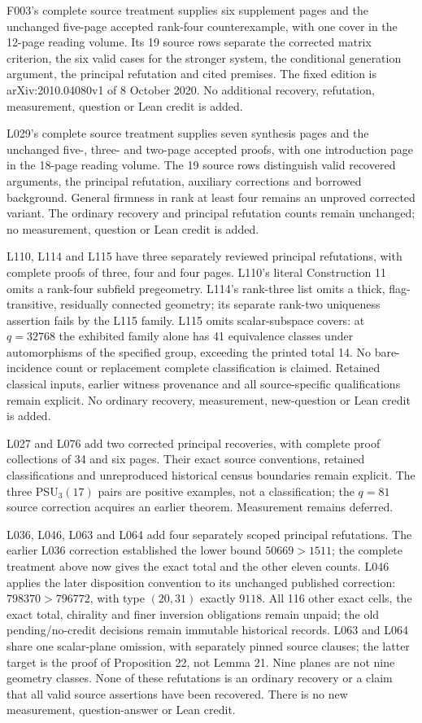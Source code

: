 \documentclass[11pt,a4paper]{article}
\begin{document}
F003's complete source treatment supplies six supplement pages and the
unchanged five-page accepted rank-four counterexample, with one cover in
the 12-page reading volume. Its 19 source rows separate the corrected
matrix criterion, the six valid cases for the stronger system, the
conditional generation argument, the principal refutation and cited
premises. The fixed edition is arXiv:2010.04080v1 of 8 October 2020.
No additional recovery, refutation, measurement, question or Lean credit
is added.

L029's complete source treatment supplies seven synthesis
pages and the unchanged five-, three- and two-page accepted proofs,
with one introduction page in the 18-page reading volume. The 19 source
rows distinguish valid recovered arguments, the principal refutation,
auxiliary corrections and borrowed background. General firmness in rank
at least four remains an unproved corrected variant. The ordinary recovery
and principal refutation counts remain unchanged; no measurement, question
or Lean credit is added.

L110, L114 and L115 have three separately reviewed principal refutations,
with complete proofs of three, four and four pages. L110's literal
Construction 11 omits a rank-four subfield pregeometry. L114's rank-three
list omits a thick, flag-transitive, residually connected geometry; its
separate rank-two uniqueness assertion fails by the L115 family. L115
omits scalar-subspace covers: at $q=32768$ the exhibited family alone has
41 equivalence classes under automorphisms of the specified group,
exceeding the printed total 14. No bare-incidence count or replacement
complete classification is claimed. Retained classical inputs, earlier
witness provenance and all source-specific qualifications remain explicit.
No ordinary recovery, measurement, new-question or Lean credit is added.

L027 and L076 add two corrected principal recoveries, with complete
proof collections of 34 and six pages. Their exact source conventions,
retained classifications and unreproduced historical census boundaries
remain explicit. The three PSU$_3(17)$ pairs are positive examples, not a
classification; the $q=81$ source correction acquires an earlier theorem.
Measurement remains deferred.

L036, L046, L063 and L064 add four separately scoped principal refutations.
The earlier L036 correction established the lower bound $50669>1511$;
the complete treatment above now gives the exact total and the other
eleven counts.
L046 applies the later disposition convention to its unchanged published
correction: $798370>796772$, with type $(20,31)$ exactly $9118$.
All 116 other exact cells, the exact total, chirality and finer inversion
obligations remain unpaid; the old pending/no-credit decisions remain
immutable historical records. L063 and L064 share one scalar-plane omission,
with separately pinned source clauses; the latter target is the proof of
Proposition 22, not Lemma 21. Nine planes are not nine geometry classes.
None of these refutations is an ordinary recovery or a claim that all valid
source assertions have been recovered. There is no new measurement,
question-answer or Lean credit.
\end{document}
